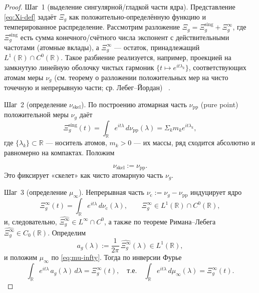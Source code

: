 \documentclass{article}
\numberwithin{equation}{section}
\theoremstyle{plain}
\theoremstyle{definition}
\theoremstyle{remark}
\def\infty{∞}\def\partial{∂}\def\sum{Σ}\def\int{∫}%
\begin{document}
\begin{proof}
Шаг~1 (выделение сингулярной/гладкой части ядра).
Представление \eqref{eq:Xi-def} задаёт $\Xi_g$ как положительно-определённую функцию и темперированное распределение.
Рассмотрим разложение $\Xi_g=\Xi_g^{\mathrm{sing}}+\Xi_g^{\infty}$, где
$\Xi_g^{\mathrm{sing}}$ есть сумма конечного/счётного числа экспонент с действительными частотами (атомные вклады), а $\Xi_g^{\infty}$ — остаток, принадлежащий $L^1(\mathbb R)\cap C^0(\mathbb R)$.
Такое разбиение реализуется, например, проекцией на замкнутую линейную оболочку чистых гармоник $\{t\mapsto e^{it\lambda_k}\}$, соответствующих атомам меры $\nu_g$ 
(см. теорему о разложении положительных мер на чисто точечную и непрерывную части; ср. Лебег–Йордан) ~\cite{Halmos1974}.

Шаг~2 (определение $\nu_{\mathrm{skel}}$).
По построению атомарная часть $\nu_{\mathrm{pp}}$ (pure point) положительной меры $\nu_g$ даёт
\begin{equation}
\label{eq:Xi-sing}
\Xi_g^{\mathrm{sing}}(t)=\int_{\mathbb R} e^{it\lambda}\,d\nu_{\mathrm{pp}}(\lambda)
=\sum_{k} m_k e^{it\lambda_k},
\end{equation}
где $\{\lambda_k\}\subset\mathbb R$ — носитель атомов, $m_k>0$ — их массы, ряд сходится абсолютно и равномерно на компактах.
Положим

\begin{equation}
\label{eq:nu-skel-def}
\nu_{\mathrm{skel}}:=\nu_{\mathrm{pp}}.
\end{equation}
Это фиксирует «скелет» как чисто атомарную часть $\nu_g$.

Шаг~3 (определение $\mu_\infty$).
Непрерывная часть $\nu_{\mathrm{c}}:=\nu_g-\nu_{\mathrm{pp}}$ индуцирует ядро
\begin{equation}
\Xi_g^{\infty}(t)=\int_{\mathbb R} e^{it\lambda}\,d\nu_{\mathrm{c}}(\lambda),
\qquad \Xi_g^{\infty}\in L^1(\mathbb R)\cap C^0(\mathbb R),
\end{equation}
и, следовательно, $\widehat{\Xi_g^{\infty}}\in L^\infty\cap C^0$, а также по теореме Римана–Лебега ~\cite{Katznelson2004}
$\widehat{\Xi_g^{\infty}}\in C_0(\mathbb R)$.
Определим
\begin{equation}
\label{eq:a-g-def}
a_g(\lambda):=\frac{1}{2\pi}\,\widehat{\Xi_g^{\infty}}(\lambda)\in L^1(\mathbb R),
\end{equation}
и положим $\mu_\infty$ по \eqref{eq:mu-infty}.
Тогда по инверсии Фурье
\begin{equation}
\int_{\mathbb R} e^{it\lambda}\,a_g(\lambda)\,d\lambda=\Xi_g^{\infty}(t),
\quad\text{т.е.}\quad
\int_{\mathbb R} e^{it\lambda}\,d\mu_\infty(\lambda)=\Xi_g^{\infty}(t).
\end{equation}


\end{proof}
\end{document}
